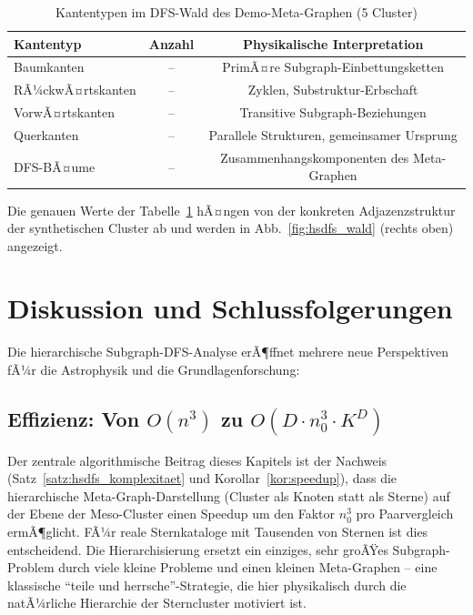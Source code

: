 ﻿\documentclass[a4paper,12pt]{report}
\theoremstyle{definition}
\begin{document}
\begin{table}[H]
\centering
\caption{Kantentypen im DFS-Wald des Demo-Meta-Graphen (5 Cluster)}
\begin{tabular}{lcc}
\toprule
Kantentyp & Anzahl & Physikalische Interpretation \\
\midrule
Baumkanten & -- & PrimÃ¤re Subgraph-Einbettungsketten \\
RÃ¼ckwÃ¤rtskanten & -- & Zyklen, Substruktur-Erbschaft \\
VorwÃ¤rtskanten & -- & Transitive Subgraph-Beziehungen \\
Querkanten & -- & Parallele Strukturen, gemeinsamer Ursprung \\
DFS-BÃ¤ume & -- & Zusammenhangskomponenten des Meta-Graphen \\
\bottomrule
\end{tabular}
\label{tab:dfs_kanten}
\end{table}

Die genauen Werte der Tabelle~\ref{tab:dfs_kanten} hÃ¤ngen von der konkreten Adjazenzstruktur der synthetischen Cluster ab und werden in Abb.~\ref{fig:hsdfs_wald} (rechts oben) angezeigt.

\section{Diskussion und Schlussfolgerungen}
\label{ssec:hsdfs_diskussion}

Die hierarchische Subgraph-DFS-Analyse erÃ¶ffnet mehrere neue Perspektiven fÃ¼r die Astrophysik und die Grundlagenforschung:

\subsection{Effizienz: Von $O(n^3)$ zu $O(D \cdot n_0^3 \cdot K^D)$}

Der zentrale algorithmische Beitrag dieses Kapitels ist der Nachweis (Satz~\ref{satz:hsdfs_komplexitaet} und Korollar~\ref{kor:speedup}), dass die hierarchische Meta-Graph-Darstellung (Cluster als Knoten statt als Sterne) auf der Ebene der Meso-Cluster einen Speedup um den Faktor $n_0^3$ pro Paarvergleich ermÃ¶glicht. FÃ¼r reale Sternkataloge mit Tausenden von Sternen ist dies entscheidend. Die Hierarchisierung ersetzt ein einziges, sehr groÃŸes Subgraph-Problem durch viele kleine Probleme und einen kleinen Meta-Graphen -- eine klassische ``teile und herrsche''-Strategie, die hier physikalisch durch die natÃ¼rliche Hierarchie der Sterncluster motiviert ist.
\end{document}
